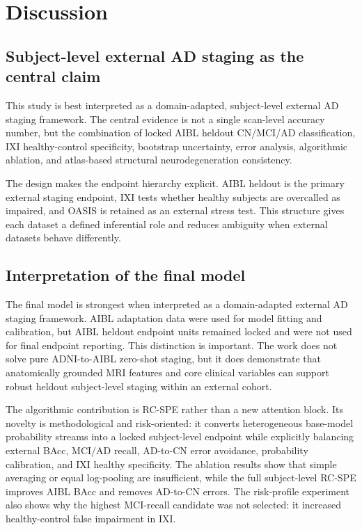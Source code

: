 \documentclass[12pt,a4paper]{article}
\begin{document}
\section{Discussion}
\label{sec:discussion}

\subsection{Subject-level external AD staging as the central claim}
\label{sec:discussion_rebuild}

This study is best interpreted as a domain-adapted, subject-level external AD staging framework. The central evidence is not a single scan-level accuracy number, but the combination of locked AIBL heldout CN/MCI/AD classification, IXI healthy-control specificity, bootstrap uncertainty, error analysis, algorithmic ablation, and atlas-based structural neurodegeneration consistency.

The design makes the endpoint hierarchy explicit. AIBL heldout is the primary external staging endpoint, IXI tests whether healthy subjects are overcalled as impaired, and OASIS is retained as an external stress test. This structure gives each dataset a defined inferential role and reduces ambiguity when external datasets behave differently.

\subsection{Interpretation of the final model}
\label{sec:discussion_model}

The final model is strongest when interpreted as a domain-adapted external AD staging framework. AIBL adaptation data were used for model fitting and calibration, but AIBL heldout endpoint units remained locked and were not used for final endpoint reporting. This distinction is important. The work does not solve pure ADNI-to-AIBL zero-shot staging, but it does demonstrate that anatomically grounded MRI features and core clinical variables can support robust heldout subject-level staging within an external cohort.

The algorithmic contribution is RC-SPE rather than a new attention block. Its novelty is methodological and risk-oriented: it converts heterogeneous base-model probability streams into a locked subject-level endpoint while explicitly balancing external BAcc, MCI/AD recall, AD-to-CN error avoidance, probability calibration, and IXI healthy specificity. The ablation results show that simple averaging or equal log-pooling are insufficient, while the full subject-level RC-SPE improves AIBL BAcc and removes AD-to-CN errors. The risk-profile experiment also shows why the highest MCI-recall candidate was not selected: it increased healthy-control false impairment in IXI.
\end{document}
